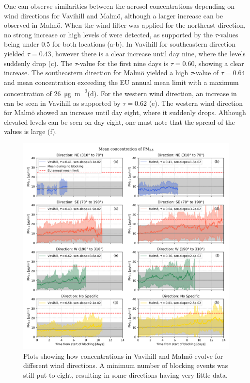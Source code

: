 One can observe similarities between the aerosol concentrations depending on wind directions for Vavihill and Malmö, although a larger increase can be observed in Malmö. When the wind filter was applied for the northeast direction, no strong increase or high levels of \PM were detected, as supported by the $\tau$-values being under 0.5 for both locations (a-b). In Vavihill for southeastern direction yielded $\tau=0.43$, however there is a clear increase until day nine, where the levels suddenly drop (c). The $\tau$-value for the first nine days is $\tau=0.60$, showing a clear increase. The southeastern direction for Malmö yielded a high $\tau$-value of $\tau=0.64$ and mean concentration exceeding the EU annual mean limit with a maximum concentration of \SI{26}{\micro\gram\per\meter\cubed}(d). For the western wind direction, an increase in \PM can be seen in Vavihill as supported by $\tau=0.62$ (e). The western wind direction for Malmö showed an increase until day eight, where it suddenly drops. Although elevated levels can be seen on day eight, one must note that the spread of the values is large (f). 

\begin{figure}[H]
    \centering
    \includegraphics[width=\textwidth]{Figures/Meanplot_dir.png}
    \caption{Plots showing how \PM concentrations in Vavihill and Malmö evolve for different wind directions. A minimum number of blocking events was still put to eight, resulting in some directions having very little data.}
    \label{fig:Meanplot_wind}
\end{figure}

